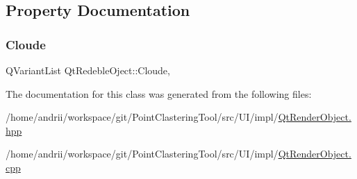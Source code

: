 \subsection{Property Documentation}
\mbox{\label{classQtRedebleOject_aefdea864a0c62b6b4a25e55b3c21b092}} 
\subsubsection{\texorpdfstring{Cloude}{Cloude}}
{\footnotesize\ttfamily Q\+Variant\+List Qt\+Redeble\+Oject\+::\+Cloude\hspace{0.3cm}{\ttfamily [read]}, {\ttfamily [write]}}



The documentation for this class was generated from the following files\+:\begin{DoxyCompactItemize}
\item 
/home/andrii/workspace/git/\+Point\+Clastering\+Tool/src/\+U\+I/impl/\mbox{\hyperlink{QtRenderObject_8hpp}{Qt\+Render\+Object.\+hpp}}\item 
/home/andrii/workspace/git/\+Point\+Clastering\+Tool/src/\+U\+I/impl/\mbox{\hyperlink{QtRenderObject_8cpp}{Qt\+Render\+Object.\+cpp}}\end{DoxyCompactItemize}
